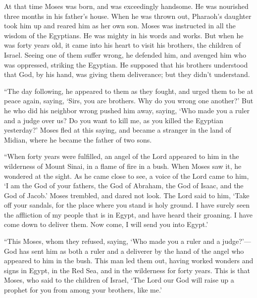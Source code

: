 {At that time Moses was born, and was exceedingly handsome. He was nourished three months in his father’s house.
When he was thrown out, Pharaoh’s daughter took him up and reared him as her own son.
Moses was instructed in all the wisdom of the Egyptians. He was mighty in his words and works.
But when he was forty years old, it came into his heart to visit his brothers, the children of Israel.
Seeing one of them suffer wrong, he defended him, and avenged him who was oppressed, striking the Egyptian.
He supposed that his brothers understood that God, by his hand, was giving them deliverance; but they didn’t understand.
\par }{\PP {}“The day following, he appeared to them as they fought, and urged them to be at peace again, saying, ‘Sirs, you are brothers. Why do you wrong one another?’
But he who did his neighbor wrong pushed him away, saying, ‘Who made you a ruler and a judge over us?
Do you want to kill me, as you killed the Egyptian yesterday?’
Moses fled at this saying, and became a stranger in the land of Midian, where he became the father of two sons.
\par }{\PP {}“When forty years were fulfilled, an angel of the Lord appeared to him in the wilderness of Mount Sinai, in a flame of fire in a bush.
When Moses saw it, he wondered at the sight. As he came close to see, a voice of the Lord came to him,
‘I am the God of your fathers, the God of Abraham, the God of Isaac, and the God of Jacob.’ Moses trembled, and dared not look.
The Lord said to him, ‘Take off your sandals, for the place where you stand is holy ground.
I have surely seen the affliction of my people that is in Egypt, and have heard their groaning. I have come down to deliver them. Now come, I will send you into Egypt.’
\par }{\PP {}“This Moses, whom they refused, saying, ‘Who made you a ruler and a judge?’—God has sent him as both a ruler and a deliverer by the hand of the angel who appeared to him in the bush.
This man led them out, having worked wonders and signs in Egypt, in the Red Sea, and in the wilderness for forty years.
This is that Moses, who said to the children of Israel, ‘The Lord our God will raise up a prophet for you from among your brothers, like me.’}
